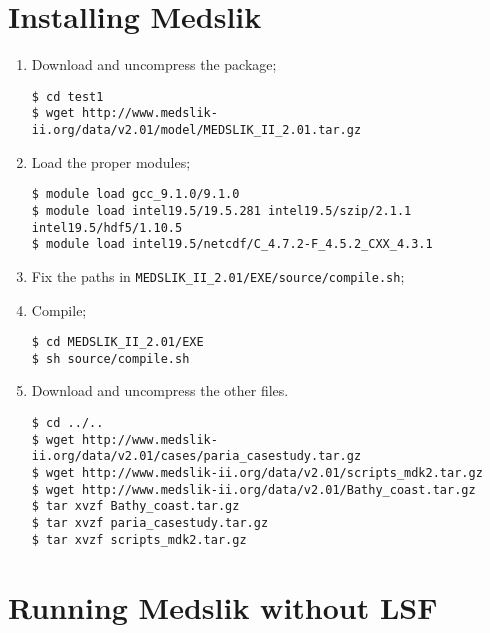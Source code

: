 \section{Installing Medslik}

\begin{enumerate}
    \item Download and uncompress the package;
    \begin{lstlisting}
$ cd test1
$ wget http://www.medslik-ii.org/data/v2.01/model/MEDSLIK_II_2.01.tar.gz        
    \end{lstlisting}
    
    \item Load the proper modules;
    \begin{lstlisting}
$ module load gcc_9.1.0/9.1.0 
$ module load intel19.5/19.5.281 intel19.5/szip/2.1.1 intel19.5/hdf5/1.10.5
$ module load intel19.5/netcdf/C_4.7.2-F_4.5.2_CXX_4.3.1
    \end{lstlisting}
    
    \item Fix the paths in \texttt{MEDSLIK\_II\_2.01/EXE/source/compile.sh};
    
    \item Compile;
    \begin{lstlisting}
$ cd MEDSLIK_II_2.01/EXE
$ sh source/compile.sh
    \end{lstlisting}
    
    \item Download and uncompress the other files.
    \begin{lstlisting}
$ cd ../..
$ wget http://www.medslik-ii.org/data/v2.01/cases/paria_casestudy.tar.gz
$ wget http://www.medslik-ii.org/data/v2.01/scripts_mdk2.tar.gz
$ wget http://www.medslik-ii.org/data/v2.01/Bathy_coast.tar.gz
$ tar xvzf Bathy_coast.tar.gz
$ tar xvzf paria_casestudy.tar.gz
$ tar xvzf scripts_mdk2.tar.gz
    \end{lstlisting}
\end{enumerate}

\section{Running Medslik without LSF}

